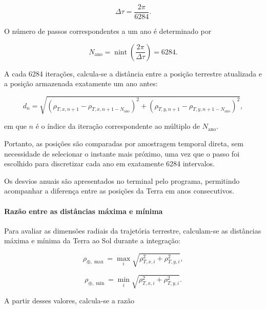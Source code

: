 \documentclass[12pt,a4paper]{article}
\begin{document}
\begin{equation}
    \Delta\tau=\frac{2\pi}{6284}.
\end{equation}

O número de passos correspondentes a um ano é determinado por

\begin{equation}
    N_{\mathrm{ano}}
    =
    \operatorname{nint}
    \left(
    \frac{2\pi}{\Delta\tau}
    \right)
    =6284.
\end{equation}

A cada 6284 iterações, calcula-se a distância entre a posição terrestre atualizada e a posição armazenada exatamente um ano antes:

\begin{equation}
    d_n=
    \sqrt{
    \left(
    \rho_{T,x,n+1}
    -
    \rho_{T,x,n+1-N_{\mathrm{ano}}}
    \right)^2
    +
    \left(
    \rho_{T,y,n+1}
    -
    \rho_{T,y,n+1-N_{\mathrm{ano}}}
    \right)^2
    },
\end{equation}

em que $n$ é o índice da iteração correspondente ao múltiplo de $N_{\mathrm{ano}}$.

Portanto, as posições são comparadas por amostragem temporal direta, sem necessidade de selecionar o instante mais próximo, uma vez que o passo foi escolhido para discretizar cada ano em exatamente 6284 intervalos.

Os desvios anuais são apresentados no terminal pelo programa, permitindo acompanhar a diferença entre as posições da Terra em anos consecutivos.

\paragraph{Razão entre as distâncias máxima e mínima}

Para avaliar as dimensões radiais da trajetória terrestre, calculam-se as distâncias máxima e mínima da Terra ao Sol durante a integração:

\begin{equation}
    \rho_{\oplus,\max}
    =
    \max_i
    \sqrt{
    \rho_{T,x,i}^2+\rho_{T,y,i}^2
    },
\end{equation}

\begin{equation}
    \rho_{\oplus,\min}
    =
    \min_i
    \sqrt{
    \rho_{T,x,i}^2+\rho_{T,y,i}^2
    }.
\end{equation}

A partir desses valores, calcula-se a razão
\end{document}
